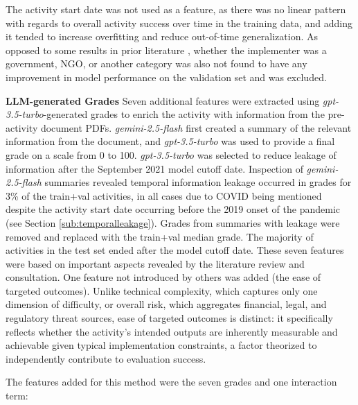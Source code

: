 \documentclass[12pt,a4paper]{article}
\let\citep\parencite
\begin{document}
The activity start date was not used as a feature, as there was no linear pattern with regards to overall activity success over time in the training data, and adding it tended to increase overfitting and reduce out-of-time generalization. As opposed to some results in prior literature \citep{vivaltHowMuchCan2020} \citep{ashtonPuzzleMissingPieces2023}, whether the implementer was a government, NGO, or another category was also not found to have any improvement in model performance on the validation set and was excluded.


\textbf{LLM-generated Grades}
Seven additional features were extracted using \emph{gpt-3.5-turbo}-generated grades to enrich the activity with information from the pre-activity document PDFs. \emph{gemini-2.5-flash} first created a summary of the relevant information from the document, and \emph{gpt-3.5-turbo} was used to provide a final grade on a scale from 0 to 100. \emph{gpt-3.5-turbo} was selected to reduce leakage of information after the September 2021 model cutoff date. Inspection of \emph{gemini-2.5-flash} summaries revealed temporal information leakage occurred in grades for 3\% of the train+val activities, in all cases due to COVID being mentioned despite the activity start date occurring before the 2019 onset of the pandemic (see Section \ref{sub:temporalleakage}). Grades from summaries with leakage were removed and replaced with the train+val median grade. The majority of activities in the test set ended after the model cutoff date. These seven features were based on important aspects revealed by the literature review and consultation. One feature not introduced by others was added (the ease of targeted outcomes). Unlike technical complexity, which captures only one dimension of difficulty, or overall risk, which aggregates financial, legal, and regulatory threat sources, ease of targeted outcomes is distinct: it specifically reflects whether the activity's intended outputs are inherently measurable and achievable given typical implementation constraints, a factor theorized to independently contribute to evaluation success.

The features added for this method were the seven grades and one interaction term:
\end{document}
